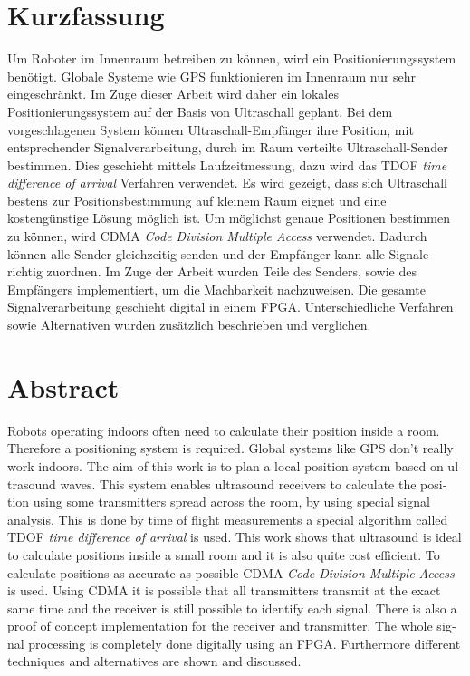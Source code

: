 \chapter{Kurzfassung}
Um Roboter im Innenraum betreiben zu können, wird ein Positionierungssystem benötigt. Globale Systeme wie GPS funktionieren im Innenraum nur sehr eingeschränkt. Im Zuge dieser Arbeit wird daher ein lokales Positionierungssystem auf der Basis von Ultraschall geplant. Bei dem vorgeschlagenen System können Ultraschall-Empfänger ihre Position, mit entsprechender Signalverarbeitung, durch im Raum verteilte Ultraschall-Sender bestimmen. Dies geschieht mittels Laufzeitmessung, dazu wird das TDOF \emph{time difference of arrival} Verfahren verwendet. Es wird gezeigt, dass sich Ultraschall bestens zur Positionsbestimmung auf kleinem Raum eignet und eine kostengünstige Lösung möglich ist. Um möglichst genaue Positionen bestimmen zu können, wird CDMA \emph{Code Division Multiple Access} verwendet. Dadurch können alle Sender gleichzeitig senden und der Empfänger kann alle Signale richtig zuordnen. Im Zuge der Arbeit wurden Teile des Senders, sowie des Empfängers implementiert, um die Machbarkeit nachzuweisen. Die gesamte Signalverarbeitung geschieht digital in einem FPGA. Unterschiedliche Verfahren sowie Alternativen wurden zusätzlich beschrieben und verglichen.

\chapter{Abstract}

\begin{english} %

Robots operating indoors often need to calculate their position inside a room. Therefore a positioning system is required. Global systems like GPS don’t really work indoors. The aim of this work is to plan a local position system based on ultrasound waves. This system enables ultrasound receivers to calculate the position using some transmitters spread across the room, by using special signal analysis. This is done by time of flight measurements a special algorithm called TDOF \emph{time difference of arrival} is used. This work shows that ultrasound is ideal to calculate positions inside a small room and it is also quite cost efficient. To calculate positions as accurate as possible CDMA \emph{Code Division Multiple Access} is used. Using CDMA it is possible that all transmitters transmit at the exact same time and the receiver is still possible to identify each signal. There is also a proof of concept implementation for the receiver and transmitter. The whole signal processing is completely done digitally using an FPGA. Furthermore different techniques and alternatives are shown and discussed.

\end{english}
